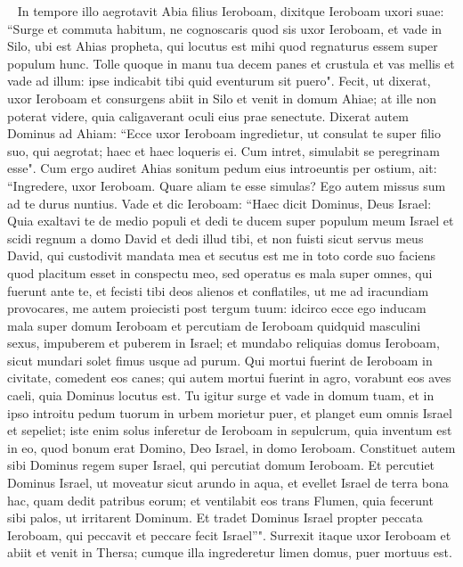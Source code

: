 \begin{biblechapter}    
\verse In tempore illo aegrotavit Abia filius Ieroboam,  
\verse dixitque Ieroboam uxori suae: “Surge et commuta habitum, ne cognoscaris quod sis uxor Ieroboam, et vade in Silo, ubi est Ahias propheta, qui locutus est mihi quod regnaturus essem super populum hunc. 
\verse Tolle quoque in manu tua decem panes et crustula et vas mellis et vade ad illum: ipse indicabit tibi quid eventurum sit puero".  
\verse Fecit, ut dixerat, uxor Ieroboam et consurgens abiit in Silo et venit in domum Ahiae; at ille non poterat videre, quia caligaverant oculi eius prae senectute. 
\verse Dixerat autem Dominus ad Ahiam: “Ecce uxor Ieroboam ingredietur, ut consulat te super filio suo, qui aegrotat; haec et haec loqueris ei. Cum intret, simulabit se peregrinam esse". 
\verse Cum ergo audiret Ahias sonitum pedum eius introeuntis per ostium, ait: “Ingredere, uxor Ieroboam. Quare aliam te esse simulas? Ego autem missus sum ad te durus nuntius. 
\verse Vade et dic Ieroboam: “Haec dicit Dominus, Deus Israel: Quia exaltavi te de medio populi et dedi te ducem super populum meum Israel 
\verse et scidi regnum a domo David et dedi illud tibi, et non fuisti sicut servus meus David, qui custodivit mandata mea et secutus est me in toto corde suo faciens quod placitum esset in conspectu meo,  
\verse sed operatus es mala super omnes, qui fuerunt ante te, et fecisti tibi deos alienos et conflatiles, ut me ad iracundiam provocares, me autem proiecisti post tergum tuum: 
\verse idcirco ecce ego inducam mala super domum Ieroboam et percutiam de Ieroboam quidquid masculini sexus, impuberem et puberem in Israel; et mundabo reliquias domus Ieroboam, sicut mundari solet fimus usque ad purum.  
\verse Qui mortui fuerint de Ieroboam in civitate, comedent eos canes; qui autem mortui fuerint in agro, vorabunt eos aves caeli, quia Dominus locutus est.  
\verse Tu igitur surge et vade in domum tuam, et in ipso introitu pedum tuorum in urbem morietur puer, 
\verse et planget eum omnis Israel et sepeliet; iste enim solus inferetur de Ieroboam in sepulcrum, quia inventum est in eo, quod bonum erat Domino, Deo Israel, in domo Ieroboam. 
\verse Constituet autem sibi Dominus regem super Israel, qui percutiat domum Ieroboam. 
\verse Et percutiet Dominus Israel, ut moveatur sicut arundo in aqua, et evellet Israel de terra bona hac, quam dedit patribus eorum; et ventilabit eos trans Flumen, quia fecerunt sibi palos, ut irritarent Dominum. 
\verse Et tradet Dominus Israel propter peccata Ieroboam, qui peccavit et peccare fecit Israel”". 
\verse Surrexit itaque uxor Ieroboam et abiit et venit in Thersa; cumque illa ingrederetur limen domus, puer mortuus est. 

\end{biblechapter}

